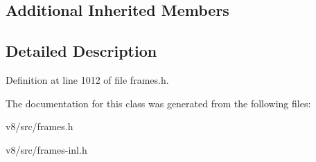 \subsection*{Additional Inherited Members}


\subsection{Detailed Description}


Definition at line 1012 of file frames.\+h.



The documentation for this class was generated from the following files\+:\begin{DoxyCompactItemize}
\item 
v8/src/frames.\+h\item 
v8/src/frames-\/inl.\+h\end{DoxyCompactItemize}
